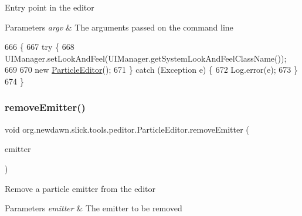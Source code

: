Entry point in the editor


\begin{DoxyParams}{Parameters}
{\em argv} & The arguments passed on the command line \\
\hline
\end{DoxyParams}

\begin{DoxyCode}
666                                            \{
667         \textcolor{keywordflow}{try} \{
668             UIManager.setLookAndFeel(UIManager.getSystemLookAndFeelClassName());
669         
670             \textcolor{keyword}{new} \mbox{\hyperlink{classorg_1_1newdawn_1_1slick_1_1tools_1_1peditor_1_1_particle_editor_a2e3d19ba973d23e1cf009aa706c8aa28}{ParticleEditor}}();
671         \} \textcolor{keywordflow}{catch} (Exception e) \{
672             Log.error(e);
673         \}
674     \}
\end{DoxyCode}
\mbox{\label{classorg_1_1newdawn_1_1slick_1_1tools_1_1peditor_1_1_particle_editor_a14f3cf420a632f5d7a625de991f07f70}} 
\subsubsection{\texorpdfstring{remove\+Emitter()}{removeEmitter()}}
{\footnotesize\ttfamily void org.\+newdawn.\+slick.\+tools.\+peditor.\+Particle\+Editor.\+remove\+Emitter (\begin{DoxyParamCaption}\item[{\mbox{\hyperlink{classorg_1_1newdawn_1_1slick_1_1particles_1_1_configurable_emitter}{Configurable\+Emitter}}}]{emitter }\end{DoxyParamCaption})\hspace{0.3cm}{\ttfamily [inline]}}

Remove a particle emitter from the editor


\begin{DoxyParams}{Parameters}
{\em emitter} & The emitter to be removed \\
\hline
\end{DoxyParams}

